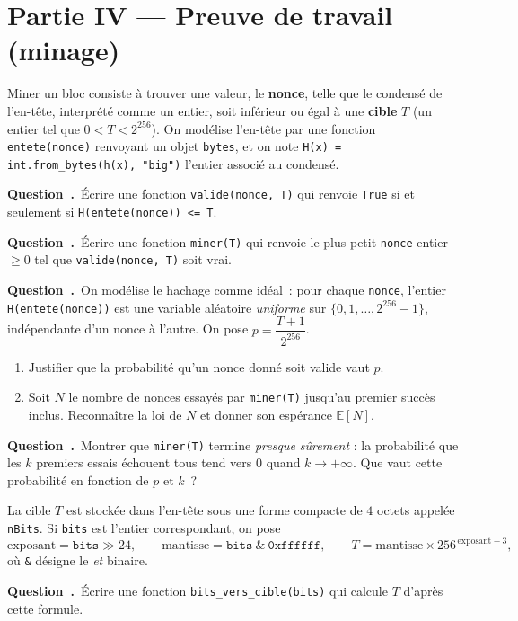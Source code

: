 \documentclass[11pt,a4paper]{article}
\newcounter{qcnt}
\newcommand{\Q}{\medskip\par\stepcounter{qcnt}\noindent\textbf{Question~\theqcnt.}~}
\newcommand{\code}[1]{\lstinline!#1!}
\begin{document}
\section*{Partie IV --- Preuve de travail (minage)}

Miner un bloc consiste à trouver une valeur, le \textbf{nonce}, telle que le condensé de l'en-tête, interprété comme un entier, soit inférieur ou égal à une \textbf{cible} $T$ (un entier tel que $0 < T < 2^{256}$). On modélise l'en-tête par une fonction \code{entete(nonce)} renvoyant un objet \code{bytes}, et on note \code{H(x) = int.from_bytes(h(x), "big")} l'entier associé au condensé.

\Q Écrire une fonction \code{valide(nonce, T)} qui renvoie \code{True} si et seulement si \code{H(entete(nonce)) <= T}.

\Q Écrire une fonction \code{miner(T)} qui renvoie le plus petit \code{nonce} entier $\ge 0$ tel que \code{valide(nonce, T)} soit vrai.

\Q On modélise le hachage comme idéal~: pour chaque \code{nonce}, l'entier \code{H(entete(nonce))} est une variable aléatoire \emph{uniforme} sur $\{0,1,\ldots,2^{256}-1\}$, indépendante d'un nonce à l'autre. On pose $p = \dfrac{T+1}{2^{256}}$.
\begin{enumerate}[label=(\alph*),nosep,leftmargin=1.6em]
  \item Justifier que la probabilité qu'un nonce donné soit valide vaut $p$.
  \item Soit $N$ le nombre de nonces essayés par \code{miner(T)} jusqu'au premier succès inclus. Reconnaître la loi de $N$ et donner son espérance $\mathbb{E}[N]$.
\end{enumerate}

\Q Montrer que \code{miner(T)} termine \emph{presque sûrement} : la probabilité que les $k$ premiers essais échouent tous tend vers $0$ quand $k\to+\infty$. Que vaut cette probabilité en fonction de $p$ et $k$~?

\medskip
La cible $T$ est stockée dans l'en-tête sous une forme compacte de $4$ octets appelée \code{nBits}. Si \code{bits} est l'entier correspondant, on pose
\[
  \text{exposant} = \texttt{bits} \gg 24, \qquad
  \text{mantisse} = \texttt{bits}\ \&\ \texttt{0xffffff}, \qquad
  T = \text{mantisse}\times 256^{\,\text{exposant}-3},
\]
où \code{&} désigne le \emph{et} binaire.

\Q Écrire une fonction \code{bits_vers_cible(bits)} qui calcule $T$ d'après cette formule.
\end{document}
